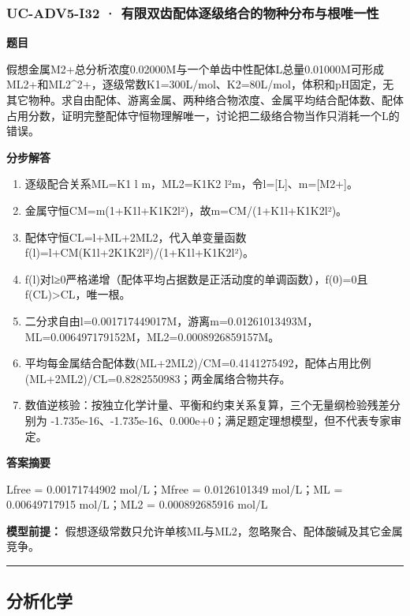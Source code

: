 \documentclass[UTF8,11pt,a4paper]{ctexart}
\begin{document}
\subsubsection*{UC-ADV5-I32 · 有限双齿配体逐级络合的物种分布与根唯一性}
\noindent\textbf{题目}\par
假想金属M2+总分析浓度0.02000M与一个单齿中性配体L总量0.01000M可形成ML2+和ML2\textasciicircum{}2+，逐级常数K1=300L/mol、K2=80L/mol，体积和pH固定，无其它物种。求自由配体、游离金属、两种络合物浓度、金属平均结合配体数、配体占用分数，证明完整配体守恒物理解唯一，讨论把二级络合物当作只消耗一个L的错误。\par
\medskip\noindent\textbf{分步解答}
\begin{enumerate}
\item 逐级配合关系ML=K1 l m，ML2=K1K2 l²m，令l=[L]、m=[M2+]。
\item 金属守恒CM=m(1+K1l+K1K2l²)，故m=CM/(1+K1l+K1K2l²)。
\item 配体守恒CL=l+ML+2ML2，代入单变量函数f(l)=l+CM(K1l+2K1K2l²)/(1+K1l+K1K2l²)。
\item f(l)对l≥0严格递增（配体平均占据数是正活动度的单调函数），f(0)=0且f(CL)>CL，唯一根。
\item 二分求自由l=0.001717449017M，游离m=0.01261013493M，ML=0.006497179152M，ML2=0.0008926859157M。
\item 平均每金属结合配体数(ML+2ML2)/CM=0.4141275492，配体占用比例(ML+2ML2)/CL=0.8282550983；两金属络合物共存。
\item 数值逆核验：按独立化学计量、平衡和约束关系复算，三个无量纲检验残差分别为 -1.735e-16、-1.735e-16、0.000e+0；满足题定理想模型，但不代表专家审定。
\end{enumerate}
\noindent\textbf{答案摘要}\par
Lfree = 0.00171744902 mol/L；Mfree = 0.0126101349 mol/L；ML = 0.00649717915 mol/L；ML2 = 0.000892685916 mol/L\par
\noindent\textbf{模型前提：}
假想逐级常数只允许单核ML与ML2，忽略聚合、配体酸碱及其它金属竞争。\par
\medskip\hrule\medskip
\subsection*{分析化学}
\end{document}
